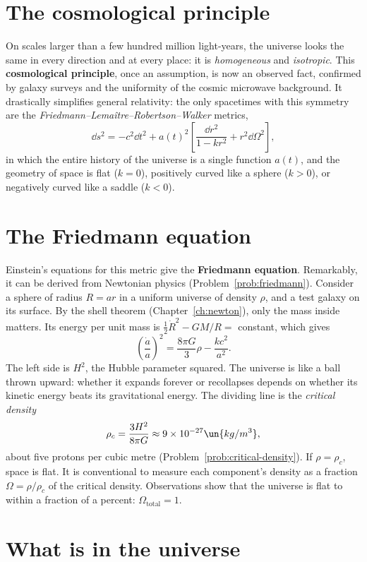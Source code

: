 \section{The cosmological principle}

On scales larger than a few hundred million light-years, the universe looks the same in every direction and at every place: it is \emph{homogeneous} and \emph{isotropic}. This \textbf{cosmological principle}, once an assumption, is now an observed fact, confirmed by galaxy surveys and the uniformity of the cosmic microwave background. It drastically simplifies general relativity: the only spacetimes with this symmetry are the \emph{Friedmann--Lema\^itre--Robertson--Walker} metrics,
\[
  \dd s^2 = -c^2\dd t^2 + a(t)^2\left[\frac{\dd r^2}{1-kr^2} + r^2\dd\Omega^2\right],
\]
in which the entire history of the universe is a single function $a(t)$, and the geometry of space is flat ($k=0$), positively curved like a sphere ($k>0$), or negatively curved like a saddle ($k<0$).

\section{The Friedmann equation}

Einstein's equations for this metric give the \textbf{Friedmann equation}. Remarkably, it can be derived from Newtonian physics (Problem~\ref{prob:friedmann}). Consider a sphere of radius $R = ar$ in a uniform universe of density $\rho$, and a test galaxy on its surface. By the shell theorem (Chapter~\ref{ch:newton}), only the mass inside matters. Its energy per unit mass is $\tfrac12\dot R^2 - GM/R = $ constant, which gives
\[
  \left(\frac{\dot a}{a}\right)^2 = \frac{8\pi G}{3}\rho - \frac{kc^2}{a^2}.
\]
The left side is $H^2$, the Hubble parameter squared. The universe is like a ball thrown upward: whether it expands forever or recollapses depends on whether its kinetic energy beats its gravitational energy. The dividing line is the \emph{critical density}
\[
  \rho_c = \frac{3H^2}{8\pi G}\approx9\times10^{-27}\un{kg/m^3},
\]
about five protons per cubic metre (Problem~\ref{prob:critical-density}). If $\rho = \rho_c$, space is flat. It is conventional to measure each component's density as a fraction $\Omega = \rho/\rho_c$ of the critical density. Observations show that the universe is flat to within a fraction of a percent: $\Omega_{\text{total}} = 1$.

\section{What is in the universe}

